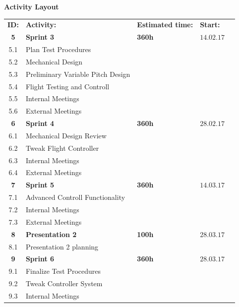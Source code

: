 \begin{center}
\textbf{\Large Activity Layout}\\
\begin{tabular}{cllll}
\rowcolor{cadetgrey}
\textbf{ID:}    &\textbf{Activity:} 	 &\textbf{Estimated time:}    &\textbf{Start:}  \\ %
\rowcolor{gainsboro}
\textbf{5} & \textbf{Sprint 3}     & \textbf{360h}     & $14.02.17$ \\
5.1     & Plan Test Procedures &  &  \\\rowcolor{gainsboro}
5.2     & Mechanical Design &  &  \\
5.3     & Preliminary Variable Pitch Design & & 
\\\rowcolor{gainsboro}
5.4     & Flight Testing and Controll &  & \\
5.5       & Internal Meetings      &    & 
\\\rowcolor{gainsboro}
5.6       & External Meetings      &    & \\
\textbf{6} & \textbf{Sprint 4}     & \textbf{360h}     & $28.02.17$ \\
\rowcolor{gainsboro}
6.1     & Mechanical Design Review & & \\
6.2     & Tweak Flight Controller & & 
\\\rowcolor{gainsboro}
6.3       & Internal Meetings      &    & \\
6.4       & External Meetings      &    & 
\\\rowcolor{gainsboro}
\textbf{7} & \textbf{Sprint 5}     & \textbf{360h}     & $14.03.17$ \\
7.1     & Advanced Controll Functionality &  & \\\rowcolor{gainsboro}
7.2       & Internal Meetings      &    & \\
7.3       & External Meetings      &    & 
\\\rowcolor{gainsboro}
\textbf{8} & \textbf{Presentation 2}     & \textbf{100h}     & $28.03.17$ \\
8.1     & Presentation 2 planning &  &  \\\rowcolor{gainsboro}
\textbf{9} & \textbf{Sprint 6}     & \textbf{360h}     & $28.03.17$ \\
9.1     & Finalize Test Procedures &  & 
\\\rowcolor{gainsboro}
9.2     & Tweak Controller System &  & \\
9.3       & Internal Meetings      &    & 

\end{tabular}
\end{center}
